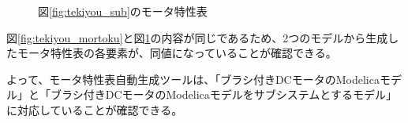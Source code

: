\begin{figure}[t]
	\centering
	\caption{図\ref{fig:tekiyou_sub}のモータ特性表}
	\label{fig:sub_mortoku}
\end{figure}

図\ref{fig:tekiyou_mortoku}と図\ref{fig:sub_mortoku}の内容が同じであるため、2つのモデルから生成したモータ特性表の各要素が、同値になっていることが確認できる。

よって、モータ特性表自動生成ツールは、「ブラシ付きDCモータのModelicaモデル」と「ブラシ付きDCモータのModelicaモデルをサブシステムとするモデル」に対応していることが確認できる。


